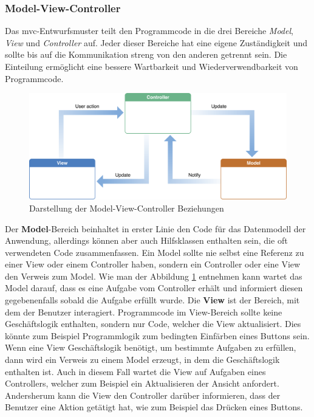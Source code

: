 \subsubsection{Model-View-Controller}
Das \ac{mvc}-Entwurfsmuster teilt den Programmcode in die drei Bereiche \textit{Model}, \textit{View} und \textit{Controller} auf.
Jeder dieser Bereiche hat eine eigene Zuständigkeit und sollte bis auf die Kommunikation streng von den anderen getrennt sein.
Die Einteilung ermöglicht eine bessere Wartbarkeit und Wiederverwendbarkeit von Programmcode.\\[10pt]
\begin{figure}[h!]
	\centering
	\includegraphics[scale=0.3]{images/model-view-controller}
	\caption{Darstellung der Model-View-Controller Beziehungen \parencite{APP2018}}
	\label{fig:model-view-controller}
\end{figure}
\pbreak%
Der \textbf{Model}-Bereich beinhaltet in erster Linie den Code für das Datenmodell der Anwendung, allerdings können aber auch Hilfsklassen enthalten sein, die oft verwendeten Code zusammenfassen.
Ein Model sollte nie selbst eine Referenz zu einer View oder einem Controller haben, sondern ein Controller oder eine View den Verweis zum Model.
Wie man der Abbildung \ref{fig:model-view-controller} entnehmen kann wartet das Model darauf, dass es eine Aufgabe vom Controller erhält und informiert diesen gegebenenfalls sobald die Aufgabe erfüllt wurde.\pbreak%
%
Die \textbf{View} ist der Bereich, mit dem der Benutzer interagiert.
Programmcode im View-Bereich sollte keine Geschäftslogik enthalten, sondern nur Code, welcher die View aktualisiert.
Dies könnte zum Beispiel Programmlogik zum bedingten Einfärben eines Buttons sein.
Wenn eine View Geschäftslogik benötigt, um bestimmte Aufgaben zu erfüllen, dann wird ein Verweis zu einem Model erzeugt, in dem die Geschäftslogik enthalten ist.
Auch in diesem Fall wartet die View auf Aufgaben eines Controllers, welcher zum Beispiel ein Aktualisieren der Ansicht anfordert.
Andersherum kann die View den Controller darüber informieren, dass der Benutzer eine Aktion getätigt hat, wie zum Beispiel das Drücken eines Buttons.\pbreak%
